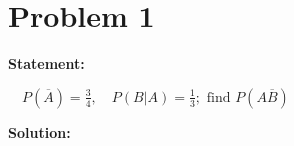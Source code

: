 \section*{Problem 1}

\textbf{Statement:}

$\quad P(\overline{A}) = \frac{3}{4}, \quad P(B|A) = \frac{1}{3}; \text{ find } P(A\overline{B})$

\noindent\textbf{Solution:}